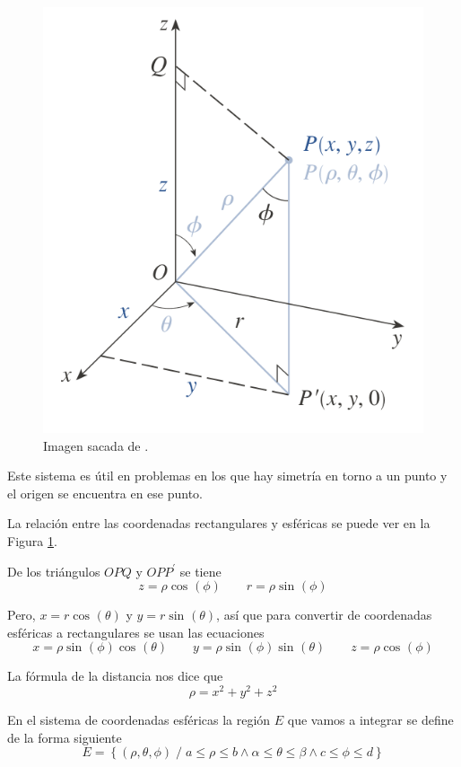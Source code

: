 \documentclass[12pt]{article}
\begin{document}
\begin{figure}[H]
\begin{minipage}{0.45\textwidth}
	\includegraphics[width=\linewidth]{imagenes/coord-esfericas2.png}
	\caption{Imagen sacada de \parencite{stewart2}.}
	\label{fig:coord-esfericas2}
  \end{minipage}
\end{figure}

Este sistema es útil en problemas en los que hay simetría en torno a un punto y el origen se encuentra en ese punto.

La relación entre las coordenadas rectangulares y esféricas se puede ver en la Figura \ref{fig:coord-esfericas2}.

De los triángulos $ OPQ $ y $ OPP^{\prime} $ se tiene 
\[
  z=\rho\cos^{}(\phi)\qquad r=\rho\sin^{}(\phi)
\]

Pero, $ x=r\cos^{}(\theta) $ y $ y=r\sin^{}(\theta) $, así que para convertir de coordenadas esféricas a rectangulares se usan las ecuaciones
\[
  x=\rho\sin^{}(\phi)\cos^{}(\theta)\qquad y=\rho\sin^{}(\phi)\sin^{}(\theta) \qquad z=\rho\cos^{}(\phi)
\]

La fórmula de la distancia nos dice que 
\[
  \rho=x^2+y^2+z^2
\]

En el sistema de coordenadas esféricas la región $ E $ que vamos a integrar se define de la forma siguiente
\[
  E=\left\{(\rho,\theta,\phi) \;/\; a\leq \rho\leq b \land \alpha\leq \theta\leq \beta \land c\leq \phi\leq d\right\}
\]
\end{document}
